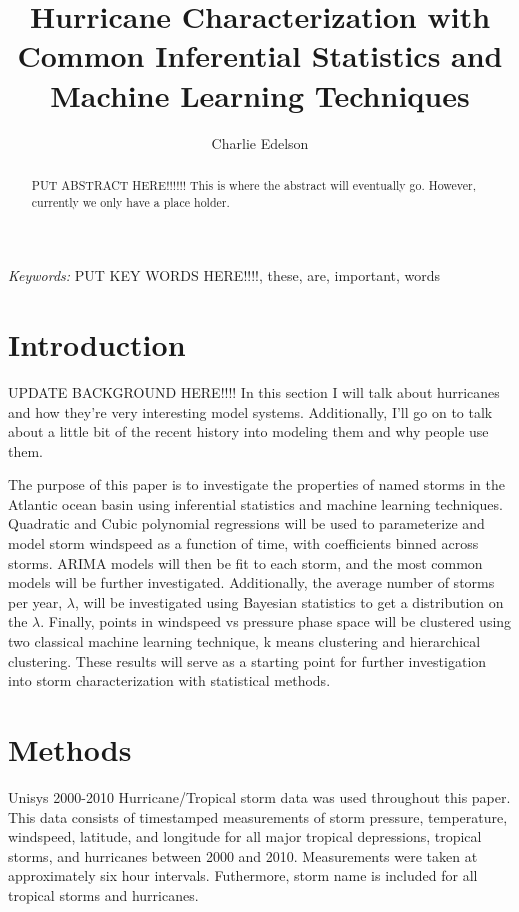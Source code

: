 \documentclass{article}
\title{Hurricane Characterization with Common Inferential Statistics and Machine Learning Techniques}
\author{Charlie Edelson}
\providecommand{\keywords}[1]{\small{\textit{Keywords:} #1}}
\begin{document}
	
	\maketitle

	\begin{abstract}
	PUT ABSTRACT HERE!!!!!! This is where the abstract will eventually go. However, currently we only have a place holder.
	\end{abstract}
	
	\keywords{PUT KEY WORDS HERE!!!!, these, are, important, words}

	\section{Introduction}
	UPDATE BACKGROUND HERE!!!! In this section I will talk about hurricanes and how they're very interesting model systems. Additionally, I'll go on to talk about a little bit of the recent history into modeling them and why people use them.
	
	The purpose of this paper is to investigate the properties of named storms in the Atlantic ocean basin using inferential statistics and machine learning techniques. Quadratic and Cubic polynomial regressions will be used to parameterize and model storm windspeed as a function of time, with coefficients binned across storms. ARIMA models will then be fit to each storm, and the most common models will be further investigated. Additionally, the average number of storms per year, $\lambda$, will be investigated using Bayesian statistics to get a distribution on the $\lambda$. Finally, points in windspeed vs pressure phase space will be clustered using two classical machine learning technique, k means clustering and hierarchical clustering. These results will serve as a starting point for further investigation into storm characterization with statistical methods.

	\section{Methods}
	Unisys 2000-2010 Hurricane/Tropical storm data\cite{Unisys} was used throughout this paper. This data consists of timestamped measurements of storm pressure, temperature, windspeed, latitude, and longitude for all major tropical depressions, tropical storms, and hurricanes between 2000 and 2010. Measurements were taken at approximately six hour intervals. Futhermore, storm name is included for all tropical storms and hurricanes.


	
	
\end{document}
